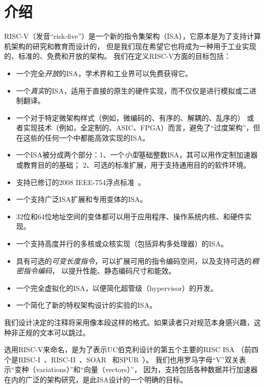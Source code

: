 \chapter{介绍}
RISC-V（发音“risk-five”）是一个新的指令集架构（ISA），它原本是为了支持计算机架构的研究和教育而设计的，
但是我们现在希望它也将成为一种用于工业实现的、标准的、免费和开放的架构。
我们在定义RISC-V方面的目标包括：

\vspace{-0.1in}
\begin{itemize}
\parskip 0pt
\itemsep 1pt
\item 一个完全{\em 开放}的ISA，学术界和工业界可以免费获得它。

\item 一个{\em 真实}的ISA，适用于直接的原生的硬件实现，而不仅仅是进行模拟或二进制翻译。

\item 一个对于特定微架构样式（例如，微编码的、有序的、解耦的、乱序的）
  或者实现技术（例如，全定制的、ASIC、FPGA）而言，避免了“过度架构”，但在这些的任何一个中都能高效实现的ISA。

\item 一个ISA被分成两个部分：1、一个{\em 小型}基础整数ISA，其可以用作定制加速器或教育目的的基础；
  2、可选的标准扩展，用于支持通用目的的软件环境。

\item 支持已修订的2008 IEEE-754浮点标准~\cite{ieee754-2008}。

\item 一个支持广泛ISA扩展和专用变体的ISA。

\item 32位和64位地址空间的变体都可以用于应用程序、操作系统内核、和硬件实现。

\item 一个支持高度并行的多核或众核实现（包括异构多处理器）的ISA。

\item 具有可选的{\em 可变长度指令}，可以扩展可用的指令编码空间，以及支持可选的{\em 稠密指令编码}，
以提升性能、静态编码尺寸和能效。

\item 一个完全虚拟化的ISA，以便简化超管级（hypervisor）的开发。

\item 一个简化了新的特权架构设计的实验的ISA。
\end{itemize}
\vspace{-0.1in}

\begin{commentary}
  我们设计决定的注释将采用像本段这样的格式。如果读者只对规范本身感兴趣，这种非正规的文本可以跳过。
\end{commentary}
\begin{commentary}
  选用RISC-V来命名，是为了表示UC伯克利设计的第五个主要的RISC ISA
  （前四个是RISC-I~\cite{riscI-isca1981}、RISC-II~\cite{Katevenis:1983}、SOAR~\cite{Ungar:1984}
  和SPUR~\cite{spur-jsscc1989}）。
  我们也用罗马字母“V”双关表示“变种（variations）”和“向量（vectors）”，
  因为，支持包括各种数据并行加速器在内的广泛的架构研究，是此ISA设计的一个明确的目标。
\end{commentary}


